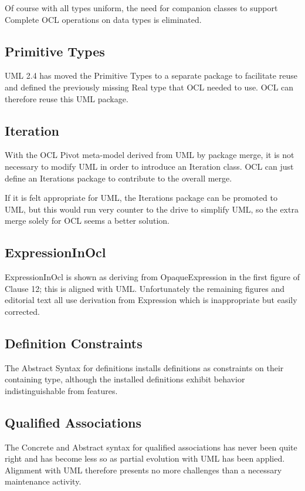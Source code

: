 \documentclass{eceasst}
\begin{document}
Of course with all types uniform, the need for companion classes to support Complete OCL operations on data types is eliminated.

\subsection{Primitive Types}

UML 2.4 has moved the Primitive Types to a separate package to facilitate reuse and defined the previously missing Real type that OCL needed to use. OCL can therefore reuse this UML package.

\subsection{Iteration}

With the OCL Pivot meta-model derived from UML by package merge, it is not necessary to modify UML in order to introduce an Iteration class. OCL can just define an Iterations package to contribute to the overall merge.

If it is felt appropriate for UML, the Iterations package can be promoted to UML, but this would run very counter to the drive to simplify UML, so the extra merge solely for OCL seems a better solution. 

\subsection{ExpressionInOcl}

ExpressionInOcl is shown as deriving from OpaqueExpression in the first figure of Clause 12; this is aligned with UML. Unfortunately the remaining figures and editorial text all use derivation from Expression which is inappropriate but easily corrected.

\subsection{Definition Constraints}

The Abstract Syntax for definitions installs definitions as constraints on their containing type, although the installed definitions exhibit behavior indistinguishable from features.

\subsection{Qualified Associations}

The Concrete and Abstract syntax for qualified associations has never been quite right and has become less so as partial evolution with UML has been applied. Alignment with UML therefore presents no more challenges than a necessary maintenance activity. 
\end{document}
